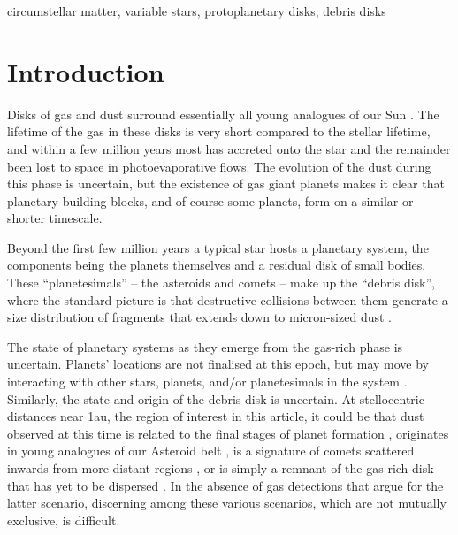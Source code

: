 \documentclass[useAMS,usenatbib,usegraphicx]{mn2e}
\begin{document}
\begin{keywords}
  circumstellar matter, variable stars, protoplanetary disks, debris disks
\end{keywords}

\section{Introduction}\label{s:intro}

Disks of gas and dust surround essentially all young analogues of our Sun
\citep[e.g.][]{2001ApJ...553L.153H}. The lifetime of the gas in these disks is very short
compared to the stellar lifetime, and within a few million years most has accreted onto
the star and the remainder been lost to space in photoevaporative flows. The evolution of
the dust during this phase is uncertain, but the existence of gas giant planets makes it
clear that planetary building blocks, and of course some planets, form on a similar or
shorter timescale.

Beyond the first few million years a typical star hosts a planetary system, the
components being the planets themselves and a residual disk of small bodies. These
``planetesimals'' -- the asteroids and comets -- make up the ``debris disk'', where the
standard picture is that destructive collisions between them generate a size distribution
of fragments that extends down to micron-sized dust
\citep[e.g.][]{1993prpl.conf.1253B,2002MNRAS.334..589W,2010RAA....10..383K}.

The state of planetary systems as they emerge from the gas-rich phase is
uncertain. Planets' locations are not finalised at this epoch, but may move by
interacting with other stars, planets, and/or planetesimals in the system
\citep[e.g.][]{2007ApJ...669.1298F,1996Sci...274..954R,2005Natur.435..459T}. Similarly,
the state and origin of the debris disk is uncertain. At stellocentric distances near
1au, the region of interest in this article, it could be that dust observed at this time
is related to the final stages of planet formation
\citep[e.g.][]{2010ApJ...717L..57M,2012MNRAS.tmp.3462J}, originates in young analogues of
our Asteroid belt \citep{2013MNRAS.433.2334K}, is a signature of comets scattered inwards
from more distant regions \citep[e.g.][]{2009MNRAS.399..385B}, or is simply a remnant of
the gas-rich disk that has yet to be dispersed \citep{2014MNRAS.tmp...88K}. In the
absence of gas detections that argue for the latter scenario, discerning among these
various scenarios, which are not mutually exclusive, is difficult.
\end{document}
